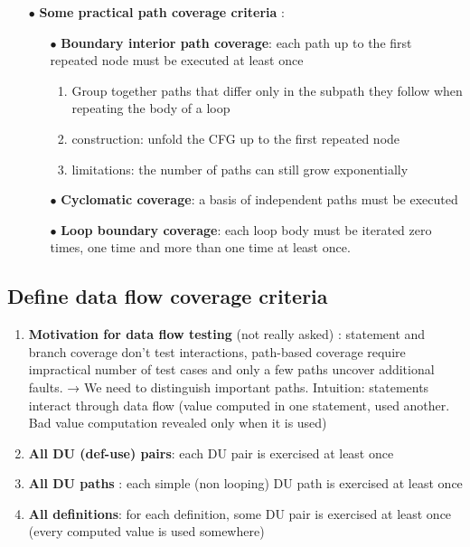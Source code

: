 \documentclass{article}
\begin{document}
\begin{multicols}{2}
\begin{itemize}
\begin{enumerate}
     \end{enumerate}
    \vfill\null\columnbreak
    \item[$\bullet$] \textbf{Some practical path coverage criteria} : 
    \begin{itemize}
    \item [$\bullet$] \textbf{Boundary interior path coverage}: each path up to the first repeated node must be executed at least once
         \begin{enumerate}
            \item Group together paths that differ only in the subpath they follow when repeating the body of a loop
            \item construction: unfold the CFG up to the first repeated node
            \item limitations: the number of paths can still grow exponentially
        \end{enumerate}
    \item [$\bullet$]\textbf{Cyclomatic coverage}: a basis of independent paths must be executed
         \item [$\bullet$]\textbf{Loop boundary coverage}: each loop body must be iterated zero times, one time and more than
one time at least once.
     \end{itemize}
 \vfill\null
\end{itemize}
\end{multicols}
\vspace{-1cm}
\subsection{Define data flow coverage criteria}
\begin{enumerate}
    \item\textbf{Motivation for data flow testing} (not really asked) : statement and branch coverage don’t test interactions, path-based coverage require impractical number of test cases and only a few paths uncover additional faults. → We need to distinguish important paths. Intuition: statements interact through data flow (value computed in one statement, used another. Bad value computation revealed only when it is used)

    \item \textbf{All DU (def-use) pairs}: each DU pair is exercised at least once
    \item \textbf{All DU paths} : each simple (non looping) DU path is exercised at least once
    \item \textbf{All definitions}: for each definition, some DU pair is exercised at least once (every computed value
is used somewhere)
\end{enumerate}
\end{document}
